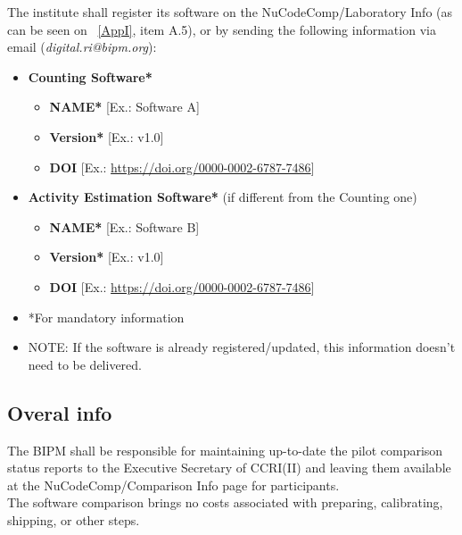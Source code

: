 \documentclass[12pt]{iopart}
\begin{document}
The institute shall register its software on the NuCodeComp/Laboratory Info (as can be seen on ~\ref{AppI}, item A.5), or by sending the following information via email (\emph{digital.ri@bipm.org}): \\

\begin{itemize}[leftmargin=2em, label={}]  %
  \item \textbf{Counting Software*}
  \begin{itemize}[leftmargin=3em]
    \item \textbf{NAME*} [Ex.: Software A]
    \item \textbf{Version*} [Ex.: v1.0]
    \item \textbf{DOI} [Ex.: \href{https://doi.org/0000-0002-6787-7486}{https://doi.org/0000-0002-6787-7486}]
  \end{itemize}
  \item \textbf{Activity Estimation Software*} (if different from the Counting one)
  \begin{itemize}[leftmargin=3em]
    \item \textbf{NAME*} [Ex.: Software B]
    \item \textbf{Version*} [Ex.: v1.0]
    \item \textbf{DOI} [Ex.: \href{https://doi.org/0000-0002-6787-7486}{https://doi.org/0000-0002-6787-7486}]
  \end{itemize}
  \item *For mandatory information \\

  \item NOTE: If the software is already registered/updated, this information doesn’t need to be delivered.
\end{itemize}

\subsection{Overal info}

The BIPM shall be responsible for maintaining up-to-date the pilot comparison status reports to the Executive Secretary of CCRI(II) and leaving them available at the NuCodeComp/Comparison Info page for participants. \\

The software comparison brings no costs associated with preparing, calibrating, shipping, or other steps. \\
\end{document}
